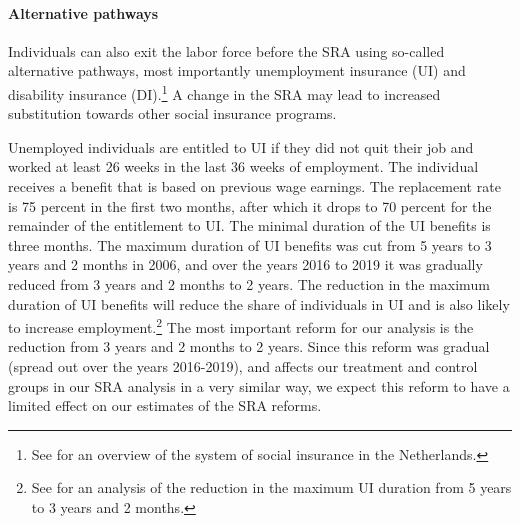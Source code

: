\documentclass[12pt,a4paper]{article}
\begin{document}
\paragraph{Alternative pathways}

Individuals can also exit the labor force before the SRA using so-called alternative pathways, most importantly unemployment insurance (UI) and disability insurance (DI).\footnote{See \cite{cpb_2020_SZ} for an overview of the system of social insurance in the Netherlands.} 
A change in the SRA may lead to increased substitution towards other social insurance programs.

Unemployed individuals are entitled to UI if they did not quit their job and worked at least 26 weeks in the last 36 weeks of employment. The individual receives a benefit that is based on previous wage earnings. The replacement rate is 75 percent in the first two months, after which it drops to 70 percent for the remainder of the entitlement to UI. The minimal duration of the UI benefits is three months. The maximum duration of UI benefits was cut from 5 years to 3 years and 2 months in 2006, and over the years 2016 to 2019 it was gradually reduced from 3 years and 2 months to 2 years. The reduction in the maximum duration of UI benefits will reduce the share of individuals in UI and is also likely to increase employment.\footnote{See \cite{groot_van_der_klaauw_2019} for an analysis of the reduction in the maximum UI duration from 5 years to 3 years and 2 months.} The most important reform for our analysis is the reduction from 3 years and 2 months to 2 years. Since this reform was gradual (spread out over the years 2016-2019), and affects our treatment and control groups in our SRA analysis in a very similar way, we expect this reform to have a limited effect on our estimates of the SRA reforms.
\end{document}
